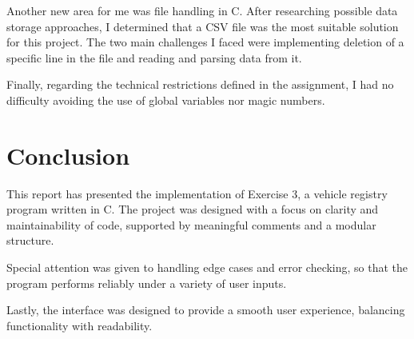 \documentclass[12pt, a4paper]{article}
\begin{document}
Another new area for me was file handling in C. After researching possible data storage approaches, I determined that a CSV file was the most suitable solution for this project. The two main challenges I faced were implementing deletion of a specific line in the file and reading and parsing data from it.

Finally, regarding the technical restrictions defined in the assignment, I had no difficulty avoiding the use of global variables nor magic numbers.

\section{Conclusion}

This report has presented the implementation of Exercise 3, a vehicle registry program written in C. The project was designed with a focus on clarity and maintainability of code, supported by meaningful comments and a modular structure. 

Special attention was given to handling edge cases and error checking, so that the program performs reliably under a variety of user inputs. 

Lastly, the interface was designed to provide a smooth user experience, balancing functionality with readability.

\newpage


\end{document}
